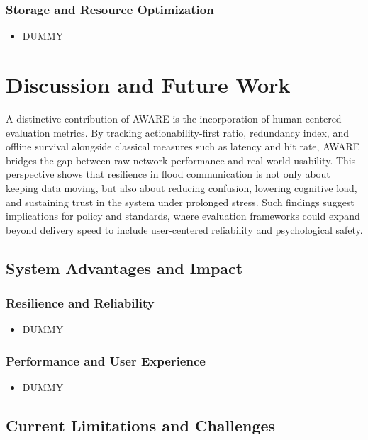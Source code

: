 \documentclass[11pt,twocolumn]{article}
\begin{document}
\subsubsection{Storage and Resource Optimization}
\begin{itemize}
\item DUMMY
\end{itemize}

\section{Discussion and Future Work}

A distinctive contribution of AWARE is the incorporation of human-centered evaluation metrics. By tracking actionability-first ratio, redundancy index, and offline survival alongside classical measures such as latency and hit rate, AWARE bridges the gap between raw network performance and real-world usability. This perspective shows that resilience in flood communication is not only about keeping data moving, but also about reducing confusion, lowering cognitive load, and sustaining trust in the system under prolonged stress. Such findings suggest implications for policy and standards, where evaluation frameworks could expand beyond delivery speed to include user-centered reliability and psychological safety.

\subsection{System Advantages and Impact}

\subsubsection{Resilience and Reliability}
\begin{itemize}
\item DUMMY
\end{itemize}

\subsubsection{Performance and User Experience}
\begin{itemize}
\item DUMMY
\end{itemize}

\subsection{Current Limitations and Challenges}
\end{document}
